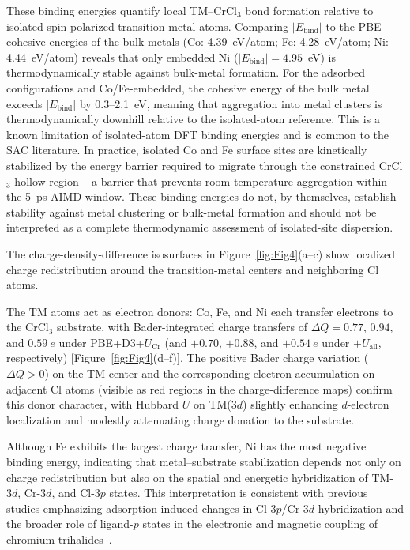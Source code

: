 \documentclass[journal=jacsat,manuscript=article]{achemso}
\begin{document}
These binding energies quantify local TM--CrCl$_3$ bond formation relative to isolated spin-polarized transition-metal atoms. {\color{revcolor}%
  Comparing $|E_{\mathrm{bind}}|$ to the PBE cohesive energies of the bulk metals (Co: 4.39~eV/atom; Fe: 4.28~eV/atom; Ni: 4.44~eV/atom) reveals that only embedded Ni ($|E_{\mathrm{bind}}| = 4.95$~eV) is thermodynamically stable against bulk-metal formation. For the adsorbed configurations and Co/Fe-embedded, the cohesive energy of the bulk metal exceeds $|E_{\mathrm{bind}}|$ by 0.3--2.1~eV, meaning that aggregation into metal clusters is thermodynamically downhill relative to the isolated-atom reference. This is a known limitation of isolated-atom DFT binding energies and is common to the SAC literature. In practice, isolated Co and Fe surface sites are kinetically stabilized by the energy barrier required to migrate through the constrained CrCl$_3$ hollow region -- a barrier that prevents room-temperature aggregation within the 5~ps AIMD window.
} These binding energies do not, by themselves, establish stability against metal clustering or bulk-metal formation and should not be interpreted as a complete thermodynamic assessment of isolated-site dispersion.

The charge-density-difference isosurfaces in Figure~\ref{fig:Fig4}(a--c) show localized charge redistribution around the transition-metal centers and neighboring Cl atoms. {\color{revcolor}%
  The TM atoms act as electron donors: Co, Fe, and Ni each transfer electrons to the CrCl$_3$ substrate, with Bader-integrated charge transfers of $\Delta Q = 0.77$, $0.94$, and $0.59~e$ under PBE+D3+$U_{\text{Cr}}$ (and $+0.70$, $+0.88$, and $+0.54~e$ under $+U_{\text{all}}$, respectively) [Figure~\ref{fig:Fig4}(d--f)]. The positive Bader charge variation ($\Delta Q > 0$) on the TM center and the corresponding electron accumulation on adjacent Cl atoms (visible as red regions in the charge-difference maps) confirm this donor character, with Hubbard $U$ on TM($3d$) slightly enhancing $d$-electron localization and modestly attenuating charge donation to the substrate.
\par} Although Fe exhibits the largest charge transfer, Ni has the most negative binding energy, indicating that metal--substrate stabilization depends not only on charge redistribution but also on the spatial and energetic hybridization of TM-$3d$, Cr-$3d$, and Cl-$3p$ states. This interpretation is consistent with previous studies emphasizing adsorption-induced changes in Cl-$3p$/Cr-$3d$ hybridization and the broader role of ligand-$p$ states in the electronic and magnetic coupling of chromium trihalides~\cite{Luo2020,Besbes2019}.
\end{document}
